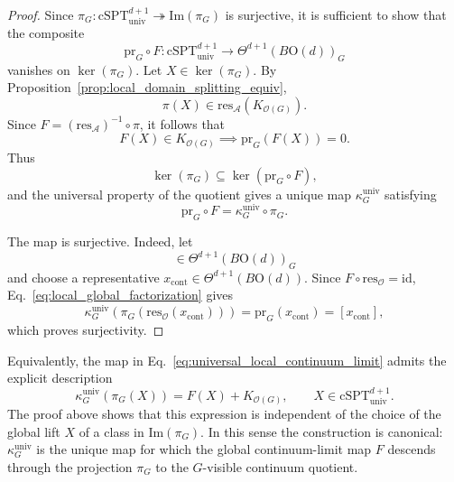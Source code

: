 \documentclass[aps,prx,reprint,superscriptaddress,twocolumn,amsmath,amssymb,amsfonts, nofootinbib]{revtex4-2}
\newcommand{\csptu}{\mathrm{cSPT}^{d+1}_{\mathrm{univ}}}
\newcommand{\res}{\text{res}}
\theoremstyle{apsstyle}
\begin{document}
\begin{proof}
Since $\pi_G:\csptu\twoheadrightarrow\mathrm{Im}(\pi_G)$ is surjective, it is sufficient to show that the composite
\begin{equation*}
    \mathrm{pr}_G\circ F:
    \csptu
    \longrightarrow
    \Theta^{d+1}(B\mathrm{O}(d))_{G}
\end{equation*}
vanishes on $\ker(\pi_G)$. Let
$X\in\ker(\pi_G)$. By
Proposition~\ref{prop:local_domain_splitting_equiv},
\begin{equation*}
    \pi(X)
    \in
    \res_{\mathcal A}(K_{\mathcal O(G)}).
\end{equation*}
Since $F=(\res_{\mathcal A})^{-1}\circ\pi$, it follows that
\begin{equation*}
    F(X)\in K_{\mathcal O(G)}\implies 
    \mathrm{pr}_G(F(X))=0.
\end{equation*}
Thus
\begin{equation*}
    \ker(\pi_G)
    \subseteq
    \ker(\mathrm{pr}_G\circ F),
\end{equation*}
and the universal property of the quotient gives a unique map
$\kappa_G^{\mathrm{univ}}$ satisfying
\begin{equation}
    \mathrm{pr}_G\circ F
    =
    \kappa_G^{\mathrm{univ}}\circ\pi_G.
    \label{eq:local_global_factorization}
\end{equation}

\noindent The map is surjective. Indeed, let
\begin{equation*}
    [x_{\mathrm{cont}}]
    \in
    \Theta^{d+1}(B\mathrm{O}(d))_{G}
\end{equation*}
and choose a representative
$x_{\mathrm{cont}}\in\Theta^{d+1}(B\mathrm{O}(d))$.
Since $F\circ\res_{\mathcal O}=\mathrm{id}$, Eq.~\ref{eq:local_global_factorization} gives
\begin{equation*}
    \kappa_G^{\mathrm{univ}}
    \left(
        \pi_G(\res_{\mathcal O}(x_{\mathrm{cont}}))
    \right)
    =
    \mathrm{pr}_G(x_{\mathrm{cont}})
    =
    [x_{\mathrm{cont}}],
\end{equation*}
which proves surjectivity.
\end{proof}

Equivalently, the map in
Eq.~\ref{eq:universal_local_continuum_limit} admits the explicit description
\begin{equation}
    \kappa_G^{\mathrm{univ}}\!\left(\pi_G(X)\right)
    =
    F(X)+K_{\mathcal O(G)},
    \qquad
    X\in\csptu.
    \label{eq:kappa_univ_explicit}
\end{equation}
The proof above shows that this expression is independent of the choice of the global lift $X$ of a class in $\mathrm{Im}(\pi_G)$. In this sense the construction is canonical: $\kappa_G^{\mathrm{univ}}$ is the unique map for which the global continuum-limit map $F$ descends through the projection $\pi_G$ to the $G$-visible continuum quotient.
\end{document}
